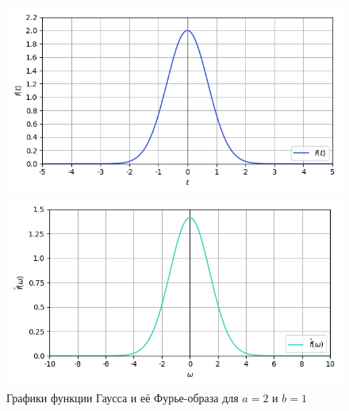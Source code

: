 \documentclass[a4paper]{article}
\begin{document}
\begin{figure}[H]
    \begin{minipage}{0.5\textwidth}
        \centering \includegraphics[width=\textwidth]{sources/4_gaussian/graph_2.png}
    \end{minipage}\hfill
    \begin{minipage}{0.5\textwidth}
        \centering \includegraphics[width=\textwidth]{sources/4_gaussian/fourier_2.png}
    \end{minipage}
    \caption{Графики функции Гаусса и её Фурье-образа для $a = 2$ и $b = 1$} 
\end{figure}
\end{document}
